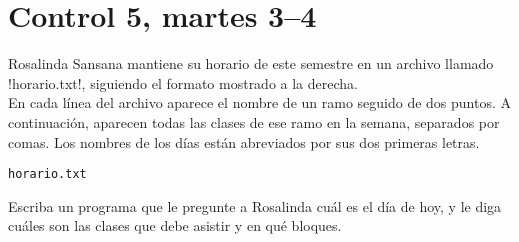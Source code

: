 \documentclass[12pt,spanish,a5paper,landscape]{article}
\begin{document}
  \part*{Control 5, martes 3--4}
  \newpage

  \begin{minipage}[t]{0.48\textwidth}
    Rosalinda Sansana mantiene su horario de este semestre
    en un archivo llamado \li!horario.txt!,
    siguiendo el formato mostrado a la derecha.
    \\[2ex]
    En cada línea del archivo aparece el nombre de un ramo
    seguido de dos puntos.
    A continuación,
    aparecen todas las clases de ese ramo en la semana,
    separados por comas.
    Los nombres de los días están abreviados
    por sus dos primeras letras.
  \end{minipage}
  \hfill
  \begin{minipage}[t]{0.42\textwidth}
    \hfil\verb!horario.txt!\hfil
    
  \end{minipage}

  Escriba un programa que le pregunte a Rosalinda
  cuál es el día de hoy,
  y le diga cuáles son las clases que debe asistir
  y en qué bloques.

  \begin{minipage}[t]{0.6\textwidth}
    
  \end{minipage}
\end{document}
